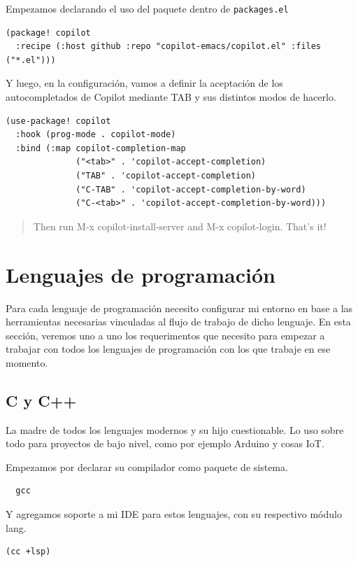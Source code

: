 \documentclass[11pt]{article}
\begin{document}
Empezamos declarando el uso del paquete dentro de \texttt{packages.el}

\begin{verbatim}
(package! copilot
  :recipe (:host github :repo "copilot-emacs/copilot.el" :files ("*.el")))
\end{verbatim}

Y luego, en la configuración, vamos a definir la aceptación de los autocompletados de Copilot mediante TAB y sus distintos modos de hacerlo.

\begin{verbatim}
(use-package! copilot
  :hook (prog-mode . copilot-mode)
  :bind (:map copilot-completion-map
              ("<tab>" . 'copilot-accept-completion)
              ("TAB" . 'copilot-accept-completion)
              ("C-TAB" . 'copilot-accept-completion-by-word)
              ("C-<tab>" . 'copilot-accept-completion-by-word)))
\end{verbatim}

\begin{quote}
Then run M-x copilot-install-server and M-x copilot-login. That's it!
\end{quote}
\section{Lenguajes de programación}
\label{sec:org55b64e3}

Para cada lenguaje de programación necesito configurar mi entorno en base a las herramientas necesarias vinculadas al flujo de trabajo de dicho lenguaje. En esta sección, veremos uno a uno los requerimentos que necesito para empezar a trabajar con todos los lenguajes de programación con los que trabaje en ese momento.
\subsection{C y C++}
\label{sec:org05cacab}

La madre de todos los lenguajes modernos y su hijo cuestionable. Lo uso sobre todo para proyectos de bajo nivel, como por ejemplo Arduino y cosas IoT.

Empezamos por declarar su compilador como paquete de sistema.

\begin{verbatim}
  gcc
\end{verbatim}

Y agregamos soporte a mi IDE para estos lenguajes, con su respectivo módulo lang.

\begin{verbatim}
(cc +lsp)
\end{verbatim}
\end{document}
